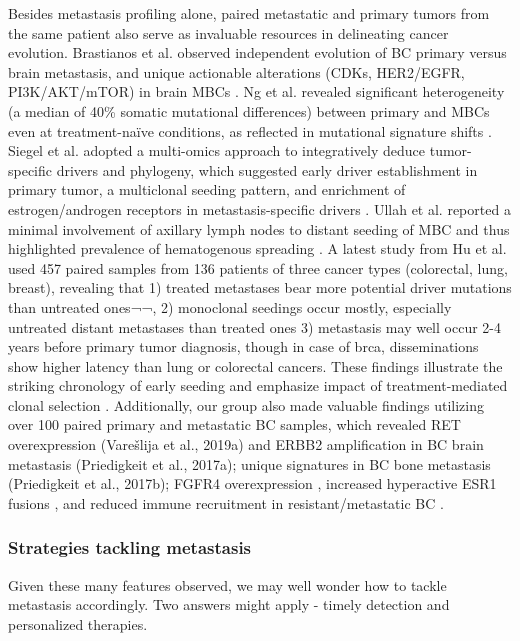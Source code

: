 Besides metastasis profiling alone, paired metastatic and primary tumors from the same patient also serve as invaluable resources in delineating cancer evolution. Brastianos et al. observed independent evolution of BC primary versus brain metastasis, and unique actionable alterations (CDKs, HER2/EGFR, PI3K/AKT/mTOR) in brain MBCs \citep{brastianos2015genomic}. Ng et al. revealed significant heterogeneity (a median of 40\% somatic mutational differences) between primary and MBCs even at treatment-naïve conditions, as reflected in mutational signature shifts \citep{ng2017genetic}. Siegel et al. adopted a multi-omics approach to integratively deduce tumor-specific drivers and phylogeny, which suggested early driver establishment in primary tumor, a multiclonal seeding pattern, and enrichment of estrogen/androgen receptors in metastasis-specific drivers \citep{siegel2018integrated}. Ullah et al. reported a minimal involvement of axillary lymph nodes to distant seeding of MBC and thus highlighted prevalence of hematogenous spreading \citep{ullah2018evolutionary}. A latest study from Hu et al. used 457 paired samples from 136 patients of three cancer types (colorectal, lung, breast), revealing that 1) treated metastases bear more potential driver mutations than untreated ones¬¬, 2) monoclonal seedings occur mostly, especially untreated distant metastases than treated ones 3) metastasis may well occur 2-4 years before primary tumor diagnosis, though in case of brca, disseminations show higher latency than lung or colorectal cancers. These findings illustrate the striking chronology of early seeding and emphasize impact of treatment-mediated clonal selection \citep{hu2020multi}. Additionally, our group also made valuable findings utilizing over 100 paired primary and metastatic BC samples, which revealed RET overexpression (Varešlija et al., 2019a) and ERBB2 amplification in BC brain metastasis (Priedigkeit et al., 2017a); unique signatures in BC bone metastasis (Priedigkeit et al., 2017b); FGFR4 overexpression \citep{levine2019fgfr4}, increased hyperactive ESR1 fusions \citep{hartmaier2018recurrent}, and reduced immune recruitment in resistant/metastatic BC \citep{zhu2019metastatic}.


\subsubsection{Strategies tackling metastasis}

Given these many features observed, we may well wonder how to tackle metastasis accordingly. Two answers might apply - timely detection and personalized therapies. 

